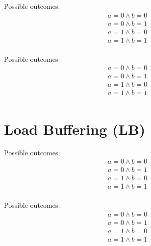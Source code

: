 \begin{minipage}[t]{0.3\linewidth}
Possible outcomes:\\
\[\begin{array}{l}
a = 0 \land b = 0\\
a = 0 \land b = 1\\
a = 1 \land b = 0\\
a = 1 \land b = 1\\
\end{array}\]
\end{minipage}
%
\sbTemplate{\sco}{\sco}{\rel}{\sco}{\sco}{\sco}
\litmusTestEnd

\begin{minipage}[t]{0.3\linewidth}
Possible outcomes:\\
\[\begin{array}{l}
a = 0 \land b = 0\\
a = 0 \land b = 1\\
a = 1 \land b = 0\\
a = 1 \land b = 1\\
\end{array}\]
\end{minipage}
%
\sbTemplate{\sco}{\sco}{\sco}{\acq}{\sco}{\sco}
\litmusTestEnd


\section{Load Buffering (LB)}
\label{app:lb}

\begin{minipage}[t]{0.3\linewidth}
Possible outcomes:\\
\[\begin{array}{l}
a = 0 \land b = 0\\
a = 0 \land b = 1\\
a = 1 \land b = 0\\
a = 1 \land b = 1\\
\end{array}\]
\end{minipage}
%
\lbTemplate{\rlx}{\rlx}{\rlx}{\rlx}{\rlx}{\rlx}
\litmusTestEnd

\begin{minipage}[t]{0.3\linewidth}
Possible outcomes:\\
\[\begin{array}{l}
a = 0 \land b = 0\\
a = 0 \land b = 1\\
a = 1 \land b = 0\\
a = 1 \land b = 1\\
\end{array}\]
\end{minipage}
%
\lbTemplate{\rlx}{\rlx}{\rlx}{\rel}{\rlx}{\rel}
\litmusTestEnd

